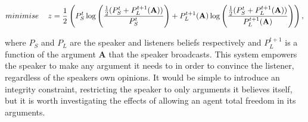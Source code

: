 \begin{equation}
    minimise \hspace{1.2em} z = \frac{1}{2} \left( P^t_S \log \left( \frac{ \frac{1}{2} (P^t_S + P^{t+1}_L(\mathbf{A})) }{P^t_S} \right) +  P^{t+1}_L(\mathbf{A}) \log \left( \frac{ \frac{1}{2} (P^t_S + P^{t+1}_L(\mathbf{A})) }{P^{t+1}_L(\mathbf{A})} \right)     \right),
\end{equation}

where $P_S$ and $P_L$ are the speaker and listeners beliefs respectively and $P_L^{t+1}$ is a function of the argument $\mathbf{A}$ that the speaker broadcasts. This system empowers the speaker to make any argument it needs to in order to convince the listener, regardless of the speakers own opinions. It would be simple to introduce an integrity constraint, restricting the speaker to only arguments it believes itself, but it is worth investigating the effects of allowing an agent total freedom in its arguments. 




